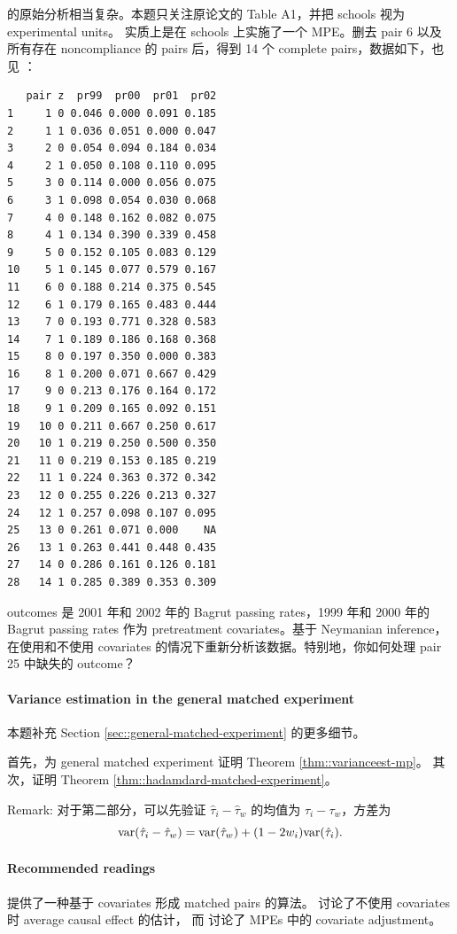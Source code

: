 \citet{angrist2009effects} 的原始分析相当复杂。本题只关注原论文的 Table A1，并把 schools 视为 experimental units。\citet{angrist2009effects} 实质上是在 schools 上实施了一个 MPE。删去 pair 6 以及所有存在 noncompliance 的 pairs 后，得到 14 个 complete pairs，数据如下，也见 ：
\begin{lstlisting}
   pair z  pr99  pr00  pr01  pr02
1     1 0 0.046 0.000 0.091 0.185
2     1 1 0.036 0.051 0.000 0.047
3     2 0 0.054 0.094 0.184 0.034
4     2 1 0.050 0.108 0.110 0.095
5     3 0 0.114 0.000 0.056 0.075
6     3 1 0.098 0.054 0.030 0.068
7     4 0 0.148 0.162 0.082 0.075
8     4 1 0.134 0.390 0.339 0.458
9     5 0 0.152 0.105 0.083 0.129
10    5 1 0.145 0.077 0.579 0.167
11    6 0 0.188 0.214 0.375 0.545
12    6 1 0.179 0.165 0.483 0.444
13    7 0 0.193 0.771 0.328 0.583
14    7 1 0.189 0.186 0.168 0.368
15    8 0 0.197 0.350 0.000 0.383
16    8 1 0.200 0.071 0.667 0.429
17    9 0 0.213 0.176 0.164 0.172
18    9 1 0.209 0.165 0.092 0.151
19   10 0 0.211 0.667 0.250 0.617
20   10 1 0.219 0.250 0.500 0.350
21   11 0 0.219 0.153 0.185 0.219
22   11 1 0.224 0.363 0.372 0.342
23   12 0 0.255 0.226 0.213 0.327
24   12 1 0.257 0.098 0.107 0.095
25   13 0 0.261 0.071 0.000    NA
26   13 1 0.263 0.441 0.448 0.435
27   14 0 0.286 0.161 0.126 0.181
28   14 1 0.285 0.389 0.353 0.309
\end{lstlisting}
outcomes 是 2001 年和 2002 年的 Bagrut passing rates，1999 年和 2000 年的 Bagrut passing rates 作为 pretreatment covariates。基于 Neymanian inference，在使用和不使用 covariates 的情况下重新分析该数据。特别地，你如何处理 pair 25 中缺失的 outcome？
 
 
\paragraph{Variance estimation in the general matched experiment} 
 \label{para::variance-general-matched}

本题补充 Section  \ref{sec::general-matched-experiment} 的更多细节。
 
 
首先，为 general matched experiment 证明 Theorem  \ref{thm::varianceest-mp}。
其次，证明 Theorem \ref{thm::hadamdard-matched-experiment}。
 
Remark: 对于第二部分，可以先验证 $\hat\tau_i -\hat\tau_w$ 的均值为 $\tau_i - \tau_w$，方差为
 $$
 \textup{var}(\hat\tau_i -\hat\tau_w) = \textup{var}(\hat\tau_w ) + (1-2w_i) \textup{var}(\hat\tau_i). 
 $$


\paragraph{Recommended readings}

\citet{greevy2004optimal} 提供了一种基于 covariates 形成 matched pairs 的算法。
\citet{imai2008variance} 讨论了不使用 covariates 时 average causal effect 的估计，
而
\citet{fogarty2018regression} 讨论了 MPEs 中的 covariate adjustment。
